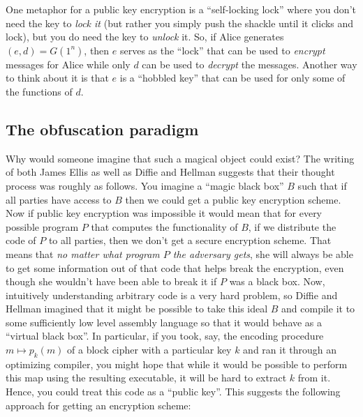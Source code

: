 One metaphor for a public key encryption is a ``self-locking lock''
where you don't need the key to \emph{lock it} (but rather you simply
push the shackle until it clicks and lock), but you do need the key to
\emph{unlock} it. So, if Alice generates \((e,d)=G(1^n)\), then \(e\)
serves as the ``lock'' that can be used to \emph{encrypt} messages for
Alice while only \(d\) can be used to \emph{decrypt} the messages.
Another way to think about it is that \(e\) is a ``hobbled key'' that
can be used for only some of the functions of \(d\).

\subsection{The obfuscation paradigm}\label{The-obfuscation-paradigm}

Why would someone imagine that such a magical object could exist? The
writing of both James Ellis as well as Diffie and Hellman suggests that
their thought process was roughly as follows. You imagine a ``magic
black box'' \(B\) such that if all parties have access to \(B\) then we
could get a public key encryption scheme. Now if public key encryption
was impossible it would mean that for every possible program \(P\) that
computes the functionality of \(B\), if we distribute the code of \(P\)
to all parties, then we don't get a secure encryption scheme. That means
that \emph{no matter what program \(P\) the adversary gets}, she will
always be able to get some information out of that code that helps break
the encryption, even though she wouldn't have been able to break it if
\(P\) was a black box. Now, intuitively understanding arbitrary code is
a very hard problem, so Diffie and Hellman imagined that it might be
possible to take this ideal \(B\) and compile it to some sufficiently
low level assembly language so that it would behave as a ``virtual black
box''. In particular, if you took, say, the encoding procedure
\(m \mapsto p_k(m)\) of a block cipher with a particular key \(k\) and
ran it through an optimizing compiler, you might hope that while it
would be possible to perform this map using the resulting executable, it
will be hard to extract \(k\) from it. Hence, you could treat this code
as a ``public key''. This suggests the following approach for getting an
encryption scheme:

